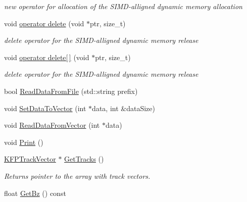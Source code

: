 \begin{DoxyCompactItemize}
\begin{DoxyCompactList}\small\item\em new operator for allocation of the S\+I\+M\+D-\/alligned dynamic memory allocation \end{DoxyCompactList}\item 
void \hyperlink{classKFPInputData_a8feffdc1042a71384f41a122d1ccee2c}{operator delete} (void $\ast$ptr, size\+\_\+t)\hypertarget{classKFPInputData_a8feffdc1042a71384f41a122d1ccee2c}{}\label{classKFPInputData_a8feffdc1042a71384f41a122d1ccee2c}

\begin{DoxyCompactList}\small\item\em delete operator for the S\+I\+M\+D-\/alligned dynamic memory release \end{DoxyCompactList}\item 
void \hyperlink{classKFPInputData_adac4b84dc7510b9b680bef66fadd2342}{operator delete\mbox{[}$\,$\mbox{]}} (void $\ast$ptr, size\+\_\+t)\hypertarget{classKFPInputData_adac4b84dc7510b9b680bef66fadd2342}{}\label{classKFPInputData_adac4b84dc7510b9b680bef66fadd2342}

\begin{DoxyCompactList}\small\item\em delete operator for the S\+I\+M\+D-\/alligned dynamic memory release \end{DoxyCompactList}\item 
bool \hyperlink{classKFPInputData_a70e4a592587ae3f5c30382cdb3206051}{Read\+Data\+From\+File} (std\+::string prefix)
\item 
void \hyperlink{classKFPInputData_a15209bd19b0cf82dcf7825dee533a180}{Set\+Data\+To\+Vector} (int $\ast$data, int \&data\+Size)
\item 
void \hyperlink{classKFPInputData_af8728e1c5feced4707d79383c5739f34}{Read\+Data\+From\+Vector} (int $\ast$data)
\item 
void \hyperlink{classKFPInputData_ae7f00e5ccaa0ec0d12b8f58b4ff66c4c}{Print} ()
\item 
\hyperlink{classKFPTrackVector}{K\+F\+P\+Track\+Vector} $\ast$ \hyperlink{classKFPInputData_a9effa7c38f7e4e23dc46dfe1c9373ee5}{Get\+Tracks} ()\hypertarget{classKFPInputData_a9effa7c38f7e4e23dc46dfe1c9373ee5}{}\label{classKFPInputData_a9effa7c38f7e4e23dc46dfe1c9373ee5}

\begin{DoxyCompactList}\small\item\em Returns pointer to the array with track vectors. \end{DoxyCompactList}\item 
float \hyperlink{classKFPInputData_acd94bee9d6725971b2a3fb1151f4e062}{Get\+Bz} () const \hypertarget{classKFPInputData_acd94bee9d6725971b2a3fb1151f4e062}{}\label{classKFPInputData_acd94bee9d6725971b2a3fb1151f4e062}


\end{DoxyCompactItemize}
